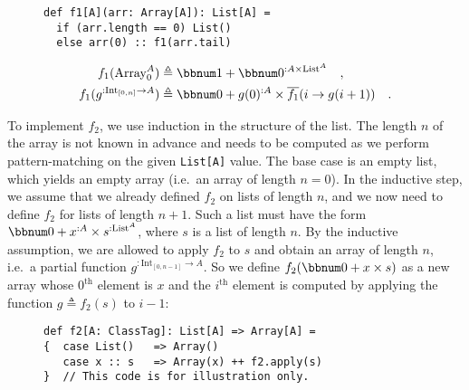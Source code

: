 \begin{wrapfigure}{l}{0.4\columnwidth}%
\vspace{-0.75\baselineskip}
\begin{lstlisting}
def f1[A](arr: Array[A]): List[A] =
  if (arr.length == 0) List()
  else arr(0) :: f1(arr.tail)
\end{lstlisting}

\vspace{-1.25\baselineskip}
\end{wrapfigure}%

\noindent \vspace{-1.25\baselineskip}
\begin{align*}
f_{1}(\text{Array}_{0}^{A}) & \triangleq\bbnum 1+\bbnum 0^{:A\times\text{List}^{A}}\quad,\\
f_{1}(g^{:\text{Int}_{[0,n]}\rightarrow A}) & \triangleq\bbnum 0+g(0)^{:A}\times\overline{f_{1}}(i\rightarrow g(i+1))\quad.
\end{align*}
\vspace{-0.5\baselineskip}

To implement $f_{2}$, we use induction in the structure of the list.
The length $n$ of the array is not known in advance and needs to
be computed as we perform pattern-matching on the given \lstinline!List[A]!
value. The base case is an empty list, which yields an empty array
(i.e.~an array of length $n=0$). In the inductive step, we assume
that we already defined $f_{2}$ on lists of length $n$, and we now
need to define $f_{2}$ for lists of length $n+1$. Such a list must
have the form $\bbnum 0+x^{:A}\times s^{:\text{List}^{A}}$, where
$s$ is a list of length $n$. By the inductive assumption, we are
allowed to apply $f_{2}$ to $s$ and obtain an array of length $n$,
i.e.~a partial function $g^{:\text{Int}_{[0,n-1]}\rightarrow A}$.
So we define $f_{2}(\bbnum 0+x\times s)$ as a new array whose $0^{\text{th}}$
element is $x$ and the $i^{\text{th}}$ element is computed by applying
the function $g\triangleq f_{2}(s)$ to $i-1$:

\begin{wrapfigure}{l}{0.4363\columnwidth}%
\vspace{-0.75\baselineskip}
\begin{lstlisting}
def f2[A: ClassTag]: List[A] => Array[A] =
{  case List()   => Array()
   case x :: s   => Array(x) ++ f2.apply(s)
}  // This code is for illustration only.
\end{lstlisting}

\vspace{-1.25\baselineskip}
\end{wrapfigure}%

